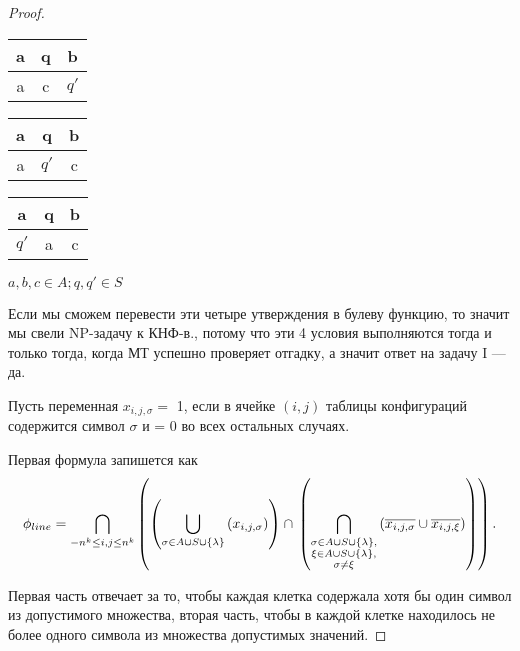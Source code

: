 \begin{proof}
\begin{enumerate}
\begin{table}[h!]
\centering
\begin{tabular}{|c|c|c|}
\hline a&q&b\\
\hline a&c&$q'$\\
\hline
\end{tabular}
\end{table}

\begin{table}[h!]
\centering
\begin{tabular}{|c|c|c|}
\hline a&q&b\\
\hline a&$q'$&c\\
\hline
\end{tabular}
\end{table}

\begin{table}[h!]
\centering
\begin{tabular}{|c|c|c|}
\hline a&q&b\\
\hline $q'$&a&c\\
\hline
\end{tabular}
\end{table}

$a, b, c \in A; q, q' \in S$

\end{enumerate}
Если мы сможем перевести эти четыре утверждения в булеву функцию, то значит мы
свели NP-задачу к КНФ-в., потому что эти 4 условия выполняются тогда и только
тогда, когда МТ успешно проверяет отгадку, а значит ответ на задачу I --- да.

Пусть переменная $x_{i,j,\sigma} =$ 1, если в ячейке  $(i,j)$ таблицы
конфигураций содержится символ  $\sigma$ и = 0 во всех остальных случаях.

Первая формула запишется как \[
	\phi_{line} = \bigcap\limits_{-n^k\le i, j\le n^k} \left( \left( \bigcup\limits_{\sigma \in A\cup S \cup
	\{\lambda \} } \left( x_{i,j,\sigma}  \right)  \right) \cap
	\\
	\left(
	\bigcap\limits_{\substack{\sigma\in A\cup S \cup
	\{\lambda \}
	, \\
\xi\in A\cup S \cup\{\lambda \},\\
\sigma \neq \xi
	}} \left( \overline{x_{i,j,\sigma}} \cup \overline{x_{i,j,\xi}} \right)
\right) \right)
.\] 

Первая часть отвечает за то, чтобы каждая клетка содержала хотя бы один символ
из допустимого множества, вторая часть, чтобы в каждой клетке находилось не
более одного символа из множества допустимых значений.


\end{proof}
